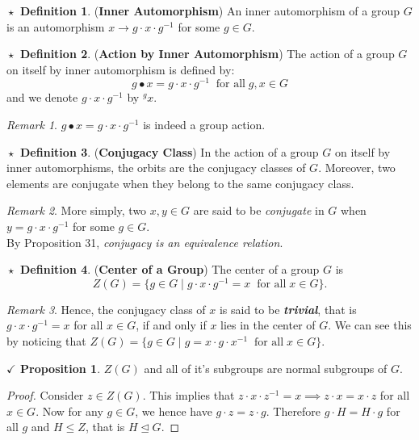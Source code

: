\documentclass{article}
\theoremstyle{definition}
\newtheorem{definition}{$\boxed{\star}$ Definition}
\theoremstyle{remark}
\newtheorem*{remark}{Remark}
\theoremstyle{definition}
\theoremstyle{definition}
\newtheorem{proposition}{$\checkmark$ Proposition}
\theoremstyle{definition}
\theoremstyle{proof}
\newcommand{\inv}[1]{#1^{-1}}
\newcommand{\nsg}[0]{\trianglelefteq}
\begin{document}
\hrulefill
\begin{definition}
	(\textbf{Inner Automorphism}) An inner automorphism of a group $ G $ is an automorphism $ x\to g\cdot x\cdot \inv{g} $ for some $ g\in G $.
\end{definition}
\hrulefill
\begin{definition}
	(\textbf{Action by Inner Automorphism}) The action of a group $ G $ on itself by inner automorphism is defined by:
	\[g\bullet x = g\cdot x\cdot \inv{g}\;\;\text{for all} \;g,x\in G\]
	and we denote $ g\cdot x\cdot \inv{g} $ by $ ^gx $.
\end{definition}
\begin{remark}
	$ g\bullet x = g\cdot x\cdot \inv{g} $ is indeed a group action.
\end{remark}
\hrulefill
\begin{definition}
	(\textbf{Conjugacy Class}) In the action of a group $ G $ on itself by inner automorphisms, the orbits are the conjugacy classes of $ G $. 	Moreover, two elements are conjugate when they belong to the same conjugacy class.
\end{definition}
\begin{remark}
	More simply, two $ x,y\in G $ are said to be \emph{conjugate} in $ G $ when $ y = g\cdot x\cdot \inv{g} $ for some $ g\in G $.\\
	By Proposition 31, \emph{conjugacy is an equivalence relation}.
\end{remark}
\hrulefill
\begin{definition}
	(\textbf{Center of a Group}) The center of a group $ G $ is 
	\[Z(G) = \{g \in G\;\vert\; g\cdot x\cdot \inv{g} = x \;\;\text{for all}\;x\in G\}.\]
\end{definition}
\begin{remark}
	Hence, the conjugacy class of $ x $ is said to be \textbf{\textit{trivial}}, that is $ g\cdot x\cdot \inv{g} = x$ for all $ x \in G$, if and only if $ x $ lies in the center of $ G $. We can see this by noticing that $ Z(G) = \{g\in G\;\vert\; g = x\cdot g\cdot \inv{x}\;\;\text{for all}\;x\in G\} $.
\end{remark}
\hrulefill
\begin{proposition}
	$ Z(G) $ and all of it's subgroups are normal subgroups of $ G $.
\end{proposition}
\begin{proof}
	Consider $ z\in Z(G) $. This implies that $ z\cdot x\cdot \inv{z} = x \implies z\cdot x = x\cdot z$ for all $ x\in G $. Now for any $ g\in G $, we hence have $ g\cdot z = z\cdot g$. Therefore $ g\cdot H = H\cdot g $ for all $ g $ and $ H\le Z $, that is $ H \nsg G$.
\end{proof}
\end{document}
